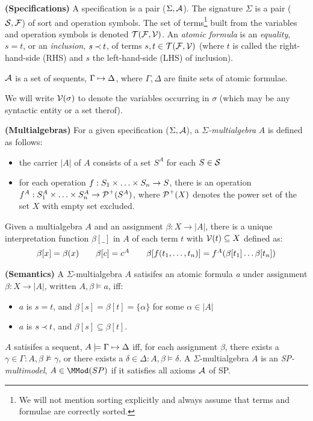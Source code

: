 \begin{DEFINITION} {\bf (Specifications)} \label{de:terms-vars-forms}
A specification is a pair ($\Sigma,\Ax$). The signature $\Sigma$ is a pair
($\Sorts,\Funcs$) of sort and operation symbols. 
The set of terms\footnote{We will not mention sorting explicitly
and always assume that terms and formulae are correctly sorted.}
 built from the variables and
operation symbols is denoted $\Terms{\Funcs,\C V}$. An {\em atomic formula} 
is an {\em equality}, $s=t$, or an {\em inclusion}, $s\Incl t$, of terms
$s,t\in\Terms{\Funcs,\Vars}$ (where $t$ is called the 
right-hand-side (RHS) and $s$ the left-hand-side (LHS) of inclusion).

 $\Ax$ is a set of sequents, $\Gamma\Seq\Delta$, where $\Gamma, \Delta$ are
finite sets of atomic formulae.
\end{DEFINITION}
\noindent
We will write $\C V(\sigma)$ to denote the variables occurring in $\sigma$ 
(which may be any syntactic entity or a set therof).
%
\begin{DEFINITION} {\bf (Multialgebras)} \label{de:multialgebras}
For a given specification ($\Sigma,\Spec$), a {\em $\Sigma$-multialgebra} $A$
is defined as follows:
\begin{itemize}\MyLPar
\item  the carrier $|A|$ of $A$ consists of a set $S^A$ for each $S\in\Sorts$
\item for each operation $f: \List Sn\times \rightarrow S$, there is an operation
$f^A: \List {S^A}n\times \rightarrow \C P^+(S^A)$, where $\C P^+(X)$ denotes the 
power set of the set $X$ with empty set excluded.
\end{itemize}
\end{DEFINITION}
\noindent
Given a multialgebra $A$ and an assignment $\beta:X\rightarrow |A|$, there is a
unique interpretation function $\beta [\_]$ in $A$ of each term $t$ 
with $\C V(t)\subseteq X$ defined as:
\[ \begin{array}{ccccc} 
\beta [x] = \beta (x) & & \beta [c] = c^A
& & \beta [f(\List tn,)] = f^A(\beta[t_1]\ldots \beta[t_n]) 
\end{array} \]
%
\begin{DEFINITION} {\bf (Semantics)} \label{de:semantics}
A $\Sigma$-multialgebra $A$ satisifes an atomic formula {\em a} under assignment
 $\beta:X\rightarrow |A|$, written $A,\beta\models a$, iff:
\begin{itemize}\MyLPar
\item $a$ is $s=t$, and $\beta[s]=\beta[t]=\{\alpha\}$ for some $\alpha\in |A|$
\item $a$ is $s\Incl t$, and $\beta[s]\subseteq\beta[t]$.
\end{itemize}
 $A$ satisifes a sequent, $A\models\Gamma\Seq\Delta$ iff,
for each assignment $\beta$, there exists a $\gamma\in\Gamma : A,\beta\not\models
\gamma$, or there exists a $\delta\in\Delta: A,\beta\models \delta$. 
A $\Sigma$-multialgebra $A$ is an {\em SP-multimodel}, $A\in \MMod(SP)$ if it satisfies 
all axioms $\Ax$ of SP.
\end{DEFINITION}
